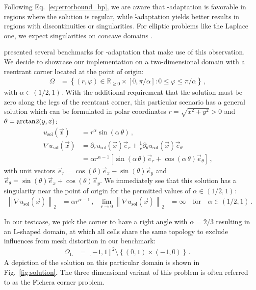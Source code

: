 Following Eq.~\ref{eq:errorbound_hp}, we are aware that \p-adaptation is favorable in regions where the solution is regular, while \h-adaptation yields better results in regions with discontinuities or singularities. For elliptic problems like the Laplace one, we expect singularities on concave domains \parencite[Sec.~5.5]{brenner2008}.

\textcite{mitchell2014} presented several benchmarks for \hp-adaptation that make use of this observation. We decide to showcase our implementation on a two-dimensional domain with a reentrant corner located at the point of origin:
\begin{align}
\Omega &= \left\{ (r,\varphi) \in \mathbb{R}_{\geq 0} \times [0, \pi/\alpha] : 0 \leq \varphi \leq \pi/\alpha \right\} \,\text{,}
\end{align}
with $\alpha \in \left(1/2, 1\right)$. With the additional requirement that the solution must be zero along the legs of the reentrant corner, this particular scenario has a general solution which can be formulated in polar coordinates $r = \sqrt{x^2 + y^2} > 0$ and $\theta = \operatorname{arctan2}(y,x)$:
\begin{align}
u_\text{sol}(\vec{x}) &= r^\alpha \sin(\alpha \, \theta) \,\text{,} \\
\nonumber \nabla u_\text{sol}(\vec{x}) &= \partial_r u_\text{sol}(\vec{x}) \vec{e}_r + \frac{1}{r} \partial_\theta u_\text{sol}(\vec{x}) \vec{e}_\theta \\
&= \alpha r^{\alpha - 1} \left[ \sin(\alpha \, \theta) \vec{e}_r + \cos(\alpha \, \theta) \vec{e}_\theta \right] \,\text{,}
\end{align}
with unit vectors \(\vec{e}_r = \cos(\theta) \vec{e}_x - \sin(\theta) \vec{e}_y\) and \(\vec{e}_\theta = \sin(\theta) \vec{e}_x + \cos(\theta) \vec{e}_y\). We immediately see that this solution has a singularity near the point of origin for the permitted values of $\alpha \in \left(1/2, 1\right)$:
\begin{align}
\left\| \nabla u_\text{sol}(\vec{x}) \right\|_{2} &= \alpha r^{\alpha - 1} \,\text{,} & \lim\limits_{r \rightarrow 0} \left\| \nabla u_\text{sol}(\vec{x}) \right\|_{2} &= \infty \quad\text{for}\quad \alpha \in \left(1/2, 1\right) \,\text{.}
\end{align}

In our testcase, we pick the corner to have a right angle with $\alpha = 2/3$ resulting in an L-shaped domain, at which all cells share the same topology to exclude influences from mesh distortion in our benchmark:
\begin{align}
\Omega_\text{L} &= \left[-1,1\right]^2 \setminus \left\{ \left(0,1\right) \times \left(-1, 0\right) \right\} \,\text{.}
\end{align}
A depiction of the solution on this particular domain is shown in Fig.~\ref{fig:solution}. The three dimensional variant of this problem is often referred to as the Fichera corner problem.

